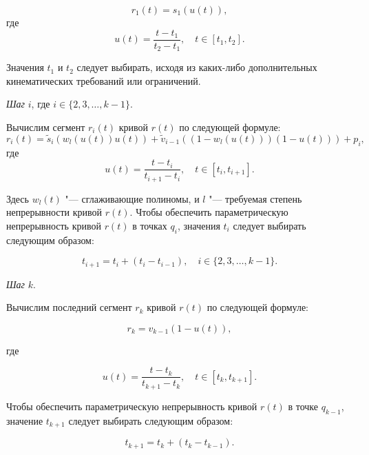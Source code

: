 $$
r_1(t)=s_1(u(t)),
$$
\noindent где
$$
u(t)=\frac{t-t_1}{t_2-t_1}, \quad t \in [t_1,t_2].
$$

Значения $t_1$ и $t_2$ следует выбирать, исходя из каких-либо дополнительных кинематических требований или ограничений.

\bigskip
\textit{Шаг} $i$, где $i \in \{2,3,\dots,k-1\}$.

Вычислим сегмент $r_i(t)$ кривой $r(t)$ по следующей формуле:
$$
r_i(t)=\tilde s_i(w_l(u(t))u(t))+\tilde v_{i-1}((1-w_l(u(t)))(1-u(t)))+p_i,
$$
\noindent где
$$
u(t)=\frac{t-t_i}{t_{i+1}-t_i}, \quad t \in [t_i,t_{i+1}].
$$

Здесь $w_l(t)$ "--- сглаживающие полиномы, и $l$ "--- требуемая степень непрерывности кривой $r(t)$. Чтобы обеспечить
параметрическую непрерывность кривой $r(t)$ в точках $q_i$, значения $t_i$ следует выбирать следующим образом:

$$
t_{i+1}=t_i+(t_i-t_{i-1}), \quad i \in \{2,3,\dots,k-1\}.
$$

\bigskip
\textit{Шаг} $k$.

Вычислим последний сегмент $r_k$ кривой $r(t)$ по следующей формуле:

$$
r_k=v_{k-1}(1-u(t)),
$$

\noindent где

$$
u(t)=\frac{t-t_k}{t_{k+1}-t_k}, \quad t \in [t_k,t_{k+1}].
$$

Чтобы обеспечить параметрическую непрерывность кривой $r(t)$ в точке $q_{k-1}$, значение $t_{k+1}$ следует выбирать
следующим образом:

$$
t_{k+1}=t_k+(t_k-t_{k-1}).
$$
